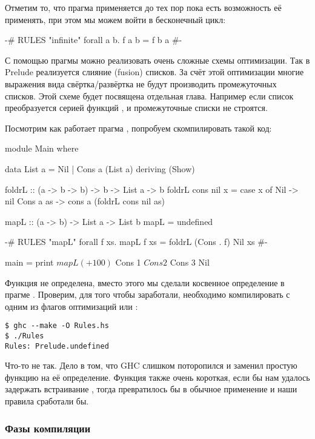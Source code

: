 Отметим то, что прагма  применяется до тех пор пока есть
возможность её применять, при этом мы можем войти в бесконечный цикл:


\begin{code}
{-# RULES
        "infinite"  forall a b. f a b = f b a 
#-}
\end{code}

С помощью прагмы  можно реализовать очень сложные схемы
оптимизации. Так в Prelude реализуется слияние (fusion) списков. За счёт
этой оптимизации многие выражения вида свёртка/развёртка не будут
производить промежуточных списков. Этой схеме будет посвящена отдельная
глава. Например если список преобразуется серией функций ,
 и  промежуточные списки не строятся.

Посмотрим как работает прагма , попробуем скомпилировать такой
код:


\begin{code}
module Main where

data List a = Nil | Cons a (List a)
    deriving (Show)

foldrL :: (a -> b -> b) -> b -> List a -> b
foldrL cons nil x = case x of
    Nil         -> nil
    Cons a as   -> cons a (foldrL cons nil as) 

mapL :: (a -> b) -> List a -> List b
mapL = undefined

{-# RULES  
"mapL"   forall f xs.
        mapL f xs = foldrL (Cons . f) Nil xs
  #-}

main = print $ mapL (+100) $ Cons 1 $ Cons 2 $ Cons 3 Nil
\end{code}

Функция  не определена, вместо этого мы сделали косвенное
определение в прагме . Проверим, для того чтобы 
заработали, необходимо компилировать с одним из флагов оптимизаций
 или :


\begin{verbatim}
$ ghc --make -O Rules.hs 
$ ./Rules
Rules: Prelude.undefined
\end{verbatim}

Что-то не так. Дело в том, что GHC слишком поторопился и заменил простую
функцию  на её определение. Функция \In{$} также очень
короткая, если бы нам удалось задержать встраивание , тогда
\In{$} превратилось бы в обычное применение и наши правила сработали бы.

\subsubsection{Фазы компиляции}

